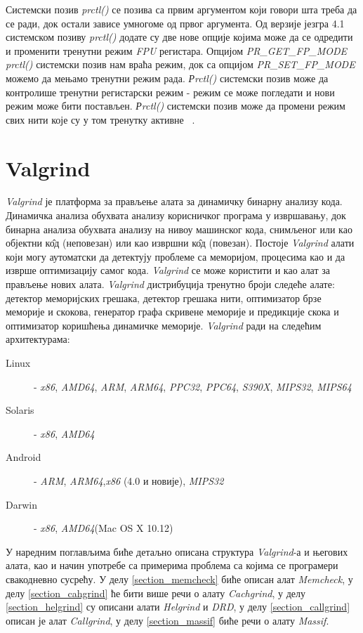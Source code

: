 \documentclass[12pt,oneside]{memoir}
\begin{document}
\indent Системски позив \textit{prctl()} се позива са првим аргументом који говори шта треба да се ради, док остали зависе умногоме од првог аргумента. Од верзије језгра 4.1 системском позиву \textit{prctl()} додате су две нове опције којима може да се одредити и променити тренутни режим \textit{FPU} регистара.  Опцијом \textit{PR\_GET\_FP\-\_MODE} \textit{prctl()} системски позив нам враћа режим, док са опцијом \textit{PR\_SET\_FP\-\_MODE} можемо да мењамо тренутни режим рада. \textit{Рrctl()} системски позив може да контролише тренутни регистарски режим - режим се може погледати и нови режим може бити постављен. \textit{Рrctl()} системски позив може да промени режим свих нити које су у том тренутку активне ~\cite{prctlRef}.


\chapter{Valgrind}
\label{chp:valgrind}

\indent \textit{Valgrind} је платформа за прављење алата за динамичку бинарну анализу кода. Динамичка анализа обухвата анализу корисничког програма у извршавању, док бинарна анализа обухвата анализу на нивоу машинског кода, снимљеног или као објектни к\^{о}д (неповезан) или као извршни к\^{о}д (повезан). Постоје \textit{Valgrind} алати који могу аутоматски да детектују проблеме са меморијом, процесима као и да изврше оптимизацију самог кода. \textit{Valgrind} се може користити и као алат за прављење нових алата. \textit{Valgrind} дистрибуција тренутно броји следеће алате: детектор меморијских грешака, детектор грешака нити, оптимизатор брзе меморије и скокова, генератор графа скривене меморије и предикције скока и оптимизатор коришћења динамичке меморије. \textit{Valgrind} ради на следећим архитектурама: 
\begin{description}
	\item[Linux] - \textit{x86}, \textit{AMD64}, \textit{ARM}, \textit{ARM64}, \textit{PPC32}, \textit{PPC64}, \textit{S390X}, \textit{MIPS32}, \textit{MIPS64}
	\item[Solaris] - \textit{x86}, \textit{AMD64}
	\item[Android] - \textit{ARM}, \textit{ARM64},\textit{x86} (4.0 и новије), \textit{MIPS32}
	\item[Darwin] - \textit{x86}, \textit{AMD64}(Mac OS X 10.12)
\end{description}

\indent У наредним поглављима биће детаљно описана структура \textit{Valgrind}-а и његових алата, као и начин употребе са примерима проблема са којима се програмери свакодневно сусрећу. У делу \ref{section_memcheck} биће описан алат \textit{Memcheck}, у делу \ref{section_cahgrind} ће бити више речи о алату \textit{Cachgrind}, у делу \ref{section_helgrind} су описани алати \textit{Helgrind} и \textit{DRD}, у делу \ref{section_callgrind} описан је алат \textit{Callgrind}, у делу \ref{section_massif} биће речи о алату \textit{Massif}.
\end{document}
